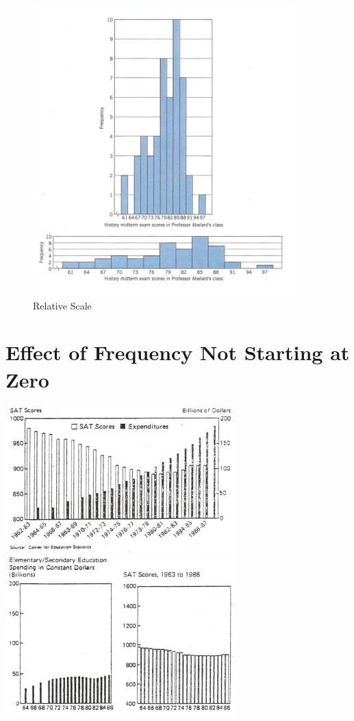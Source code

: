 \documentclass[12pt]{article}
\begin{document}
\begin{figure}[H]
\centering
\includegraphics[width=4in]{Relative_Scale.png}
\caption{Relative Scale}
\end{figure}

\section{Effect of Frequency Not Starting at
Zero}\label{effect-of-frequency-not-starting-at-zero}

\includegraphics[width=3.5in]{Freq_NotZero.png}
 \includegraphics[width=3.5in]{Freq_NotZero2.png}
\end{document}
